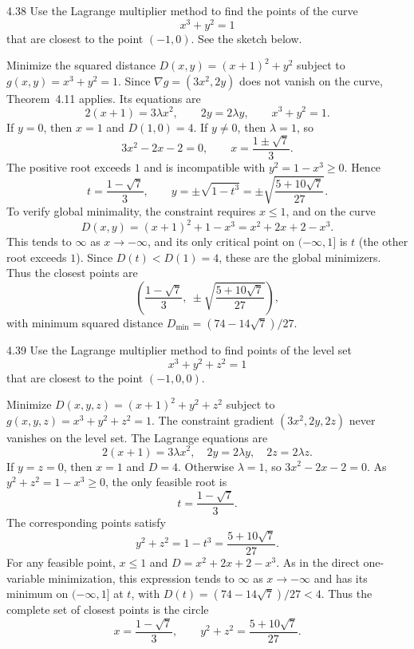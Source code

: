 \documentclass[11pt,oneside]{article}
\begin{document}
\begin{problem}{4.38}
Use the Lagrange multiplier method to find the points of the curve
\[
 x^3+y^2=1
\]
that are closest to the point $(-1,0)$. See the sketch below.
\begin{center}
\end{center}
\end{problem}
\begin{solution}
Minimize the squared distance
$D(x,y)=(x+1)^2+y^2$ subject to $g(x,y)=x^3+y^2=1$.
Since $\nabla g=(3x^2,2y)$ does not vanish on the curve,
Theorem~4.11 applies. Its equations are
\[
 2(x+1)=3\lambda x^2,
 \qquad 2y=2\lambda y,
 \qquad x^3+y^2=1.
\]
If $y=0$, then $x=1$ and $D(1,0)=4$.
If $y\ne0$, then $\lambda=1$, so
\[
 3x^2-2x-2=0,
 \qquad x=\frac{1\pm\sqrt7}{3}.
\]
The positive root exceeds $1$ and is incompatible with
$y^2=1-x^3\ge0$. Hence
\[
 t=\frac{1-\sqrt7}{3},\qquad
 y=\pm\sqrt{1-t^3}
  =\pm\sqrt{\frac{5+10\sqrt7}{27}}.
\]
To verify global minimality, the constraint requires $x\le1$,
and on the curve
\[
 D(x,y)=(x+1)^2+1-x^3=x^2+2x+2-x^3.
\]
This tends to $\infty$ as $x\to-\infty$, and its only critical
point on $(-\infty,1]$ is $t$ (the other root exceeds $1$).
Since $D(t)<D(1)=4$, these are the global minimizers.
Thus the closest points are
\[
 \boxed{\left(\frac{1-\sqrt7}{3},\ \pm\sqrt{\frac{5+10\sqrt7}{27}}\right)},
\]
with minimum squared distance
$\boxed{D_{\min}=(74-14\sqrt7)/27}$.
\end{solution}

\begin{problem}{4.39}
Use the Lagrange multiplier method to find points of the level set
\[
 x^3+y^2+z^2=1
\]
that are closest to the point $(-1,0,0)$.
\end{problem}
\begin{solution}
Minimize $D(x,y,z)=(x+1)^2+y^2+z^2$ subject to
$g(x,y,z)=x^3+y^2+z^2=1$. The constraint gradient
$(3x^2,2y,2z)$ never vanishes on the level set.
The Lagrange equations are
\[
 2(x+1)=3\lambda x^2,
 \quad 2y=2\lambda y,
 \quad 2z=2\lambda z.
\]
If $y=z=0$, then $x=1$ and $D=4$.
Otherwise $\lambda=1$, so
$3x^2-2x-2=0$. As $y^2+z^2=1-x^3\ge0$, the only feasible
root is
\[
 t=\frac{1-\sqrt7}{3}.
\]
The corresponding points satisfy
\[
 y^2+z^2=1-t^3=\frac{5+10\sqrt7}{27}.
\]
For any feasible point, $x\le1$ and
$D=x^2+2x+2-x^3$. As in the direct one-variable
minimization, this expression tends to $\infty$ as $x\to-\infty$
and has its minimum on $(-\infty,1]$ at $t$, with
$D(t)=(74-14\sqrt7)/27<4$.
Thus the complete set of closest points is the circle
\[
 \boxed{x=\frac{1-\sqrt7}{3},\qquad
 y^2+z^2=\frac{5+10\sqrt7}{27}}.
\]
\end{solution}
\end{document}
